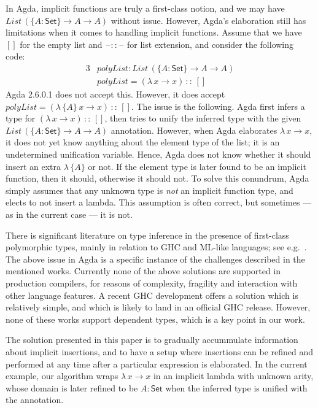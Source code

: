 \documentclass[acmsmall,review,anonymous,prologue,dvipsnames]{acmart}\settopmatter{printfolios=true,printccs=false,printacmref=false}
\newcommand{\blank}{\mathord{\hspace{1pt}\text{--}\hspace{1pt}}}
\newcommand{\kw}[1]{{\mathsf{#1}}}
\theoremstyle{remark}
\begin{document}
In Agda, implicit functions are truly a first-class notion, and we may have
$List\,(\{A : \kw{Set}\}\to A \to A)$ without issue. However, Agda's elaboration
still has limitations when it comes to handling implicit functions. Assume that
we have $[]$ for the empty list and $\blank::\blank$ for list extension,
and consider the following code:
\begin{alignat*}{3}
  & polyList : List\,(\{A : \kw{Set}\}\to A \to A)\\
  & polyList = (\lambda\,x \to x)\,::\,[]
\end{alignat*}
Agda 2.6.0.1 does not accept this. However, it does accept $polyList =
(\lambda\,\{A\}\,x \to x)\,::\,[]$. The issue is the following. Agda first
infers a type for $(\lambda\,x \to x)\,::\,[]$, then tries to unify the
inferred type with the given $List\,(\{A : \kw{Set}\}\to A \to A)$
annotation. However, when Agda elaborates $\lambda\,x \to x$, it does not yet
know anything about the element type of the list; it is an undetermined
unification variable. Hence, Agda does not know whether it should insert an
extra $\lambda\,\{A\}$ or not. If the element type is later found to be an
implicit function, then it should, otherwise it should not. To solve this
conundrum, Agda simply assumes that any unknown type is \emph{not} an implicit
function type, and elects to not insert a lambda. This assumption is often
correct, but sometimes --- as in the current case --- it is not.

There is significant literature on type inference in the presence of first-class
polymorphic types, mainly in relation to GHC and ML-like languages; see
e.g.\ \cite{leijen2008hmf,leijen2009flexible,serrano2018guarded,vytiniotis2006boxy}.
The above issue in Agda is a specific instance of the challenges described in
the mentioned works. Currently none of the above solutions are supported in
production compilers, for reasons of complexity, fragility and interaction with
other language features. A recent GHC development \cite{serrano2020a} offers a
solution which is relatively simple, and which is likely to land in an official
GHC release. However, none of these works support dependent types, which is a
key point in our work.

The solution presented in this paper is to gradually accummulate information
about implicit insertions, and to have a setup where insertions can be refined
and performed at any time after a particular expression is elaborated. In the
current example, our algorithm wraps $\lambda\,x\to x$ in an implicit lambda
with unknown arity, whose domain is later refined to be $A : \kw{Set}$ when the
inferred type is unified with the annotation.
\end{document}
